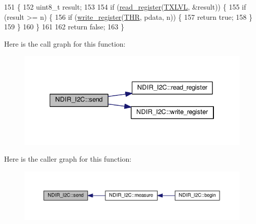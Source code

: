 \begin{DoxyCode}
151                                                 \{
152     uint8\_t result;
153 
154     \textcolor{keywordflow}{if} (\hyperlink{class_n_d_i_r___i2_c_aa72058e6e7c6174b14466fee4b2df1e0}{read\_register}(\hyperlink{_cool_n_d_i_r___i2_c_8cpp_a395aad125960f7ee2bf0a23c4ea06fcf}{TXLVL}, &result)) \{
155         \textcolor{keywordflow}{if} (result >= n) \{
156             \textcolor{keywordflow}{if} (\hyperlink{class_n_d_i_r___i2_c_a5de6a044b00e985f035edca07521e319}{write\_register}(\hyperlink{_cool_n_d_i_r___i2_c_8cpp_a5e9787adf3c9afcc4b781e85bb545b35}{THR}, pdata, n)) \{
157                 \textcolor{keywordflow}{return} \textcolor{keyword}{true};
158             \}
159         \}
160     \}
161 
162     \textcolor{keywordflow}{return} \textcolor{keyword}{false};
163 \}
\end{DoxyCode}
Here is the call graph for this function\+:\nopagebreak
\begin{figure}[H]
\begin{center}
\leavevmode
\includegraphics[width=334pt]{d6/ddb/class_n_d_i_r___i2_c_aab0c04c2b7d08e99d12af044df179f0c_cgraph}
\end{center}
\end{figure}
Here is the caller graph for this function\+:\nopagebreak
\begin{figure}[H]
\begin{center}
\leavevmode
\includegraphics[width=350pt]{d6/ddb/class_n_d_i_r___i2_c_aab0c04c2b7d08e99d12af044df179f0c_icgraph}
\end{center}
\end{figure}
\mbox{\label{class_n_d_i_r___i2_c_a5de6a044b00e985f035edca07521e319}} 
